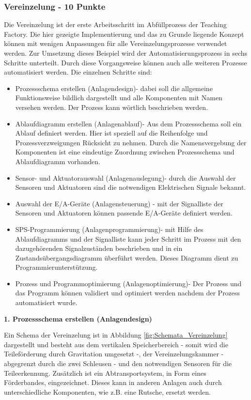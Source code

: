 \subsubsection{Vereinzelung - 10 Punkte}

Die Vereinzelung ist der erste Arbeitsschritt im Abfüllprozess der Teaching Factory. Die hier gezeigte Implementierung und das zu Grunde liegende Konzept können mit wenigen Anpassungen für alle Vereinzelungsprozesse verwendet werden. Zur Umsetzung dieses Beispiel wird der Automatisierungsprozess in sechs Schritte unterteilt. Durch diese Vorgangsweise können auch alle weiteren Prozesse automatisiert werden. Die einzelnen Schritte sind:

\begin{itemize}
	\item[1] Prozessschema erstellen (Anlagendesign)- dabei soll die allgemeine Funktionsweise bildlich dargestellt und alle Komponenten mit Namen versehen werden. Der Prozess kann wörtlich beschrieben werden. 
	\item[2.] Ablaufdiagramm erstellen (Anlagenablauf)- Aus dem Prozessschema soll ein Ablauf definiert werden. Hier ist speziell auf die Reihenfolge und Prozessverzweigungen Rücksicht zu nehmen. Durch die Namensvergebung der Komponenten ist eine eindeutige Zuordnung zwischen Prozessschema und Ablaufdiagramm vorhanden.
	\item[3.] Sensor- und Aktuatorauswahl (Anlagenauslegung)- durch die Auswahl der Sensoren und Aktuatoren sind die notwendigen Elektrischen Signale bekannt. 
	\item[4.] Auswahl der E/A-Geräte (Anlagensteuerung) - mit der Signalliste der Sensoren und Aktuatoren können passende E/A-Geräte definiert werden. 
	\item[5.]  SPS-Programmierung (Anlagenprogrammierung)- mit Hilfe des Ablaufdiagramms und der Signalliste kann jeder Schritt im Prozess mit den dazugehörenden Signalzuständen beschrieben und in ein Zustandsübergangsdiagramm überführt werden. Dieses Diagramm dient zu Programmierunterstützung.
	\item[6.] Prozess und Programmoptimierung (Anlagenoptimierung)- Der Prozess und das Programm können validiert und optimiert werden nachdem der Prozess automatisiert wurde. 	 
\end{itemize} 

\textbf{1. Prozessschema erstellen (Anlagendesign)}

Ein Schema der Vereinzelung ist in Abbildung \ref{fig:Schemata_Vereinzelung} dargestellt und besteht aus dem vertikalen Speicherbereich - somit wird die Teileförderung durch Gravitation umgesetzt -, der Vereinzelungskammer - abgegrenzt durch die zwei Schleusen - und den notwendigen Sensoren für die Teileerkennung. Zusätzlich ist ein Abtransportsystem, in Form eines Förderbandes, eingezeichnet. Dieses kann in anderen Anlagen auch durch unterschiedliche Komponenten, wie z.B. eine Rutsche, ersetzt werden.


